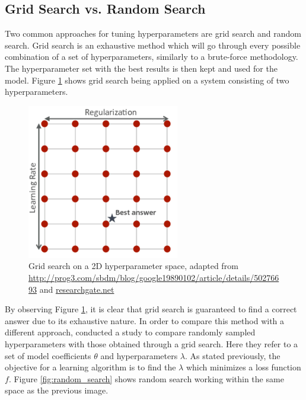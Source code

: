 \subsection{Grid Search vs. Random Search}
\label{sec:grid-search-vs-random-search}
Two common approaches for tuning hyperparameters are grid search and random search. Grid search is an exhaustive method which will go through every possible combination of a set of hyperparameters, similarly to a brute-force methodology. The hyperparameter set with the best results is then kept and used for the model. Figure \ref{fig:grid_search} shows grid search being applied on a  system consisting of two hyperparameters.

\begin{figure}
	\centering
	\includegraphics[width=0.45\linewidth]{graphics/hyperparameters/grid}
	\caption{Grid search on a 2D hyperparameter space, adapted from \url{http://prog3.com/sbdm/blog/google19890102/article/details/50276693} and \url{researchgate.net}}
	\label{fig:grid_search}
\end{figure}

By observing Figure \ref{fig:grid_search}, it is clear that grid search is guaranteed to find a correct answer due to its exhaustive nature. In order to compare this method with a different approach, \cite{Bergstra2012} conducted a study to compare randomly sampled hyperparameters with those obtained through a grid search. Here they refer to a set of model coefficients $\theta$ and hyperparameters $\lambda$. As stated previously, the objective for a learning algorithm is to find the $\lambda$ which minimizes a loss function $f$.  Figure \ref{fig:random_search} shows random search working within the same space as the previous image.



